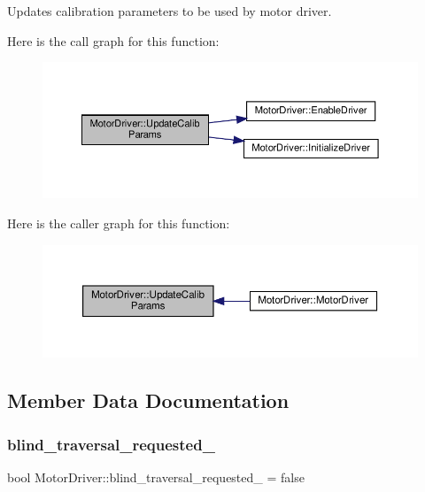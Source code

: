 Updates calibration parameters to be used by motor driver. 

Here is the call graph for this function\+:
\nopagebreak
\begin{figure}[H]
\begin{center}
\leavevmode
\includegraphics[width=350pt]{classMotorDriver_a04e97c6adc4df4d186d6799dfd8165b2_cgraph}
\end{center}
\end{figure}
Here is the caller graph for this function\+:
\nopagebreak
\begin{figure}[H]
\begin{center}
\leavevmode
\includegraphics[width=350pt]{classMotorDriver_a04e97c6adc4df4d186d6799dfd8165b2_icgraph}
\end{center}
\end{figure}


\subsection{Member Data Documentation}
\mbox{\label{classMotorDriver_acc772188969ac8c859d1e9c800eb0076}} 
\subsubsection{\texorpdfstring{blind\+\_\+traversal\+\_\+requested\+\_\+}{blind\_traversal\_requested\_}}
{\footnotesize\ttfamily bool Motor\+Driver\+::blind\+\_\+traversal\+\_\+requested\+\_\+ = false\hspace{0.3cm}{\ttfamily [private]}}

